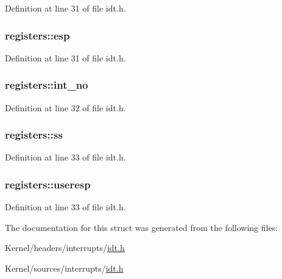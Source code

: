 Definition at line 31 of file idt.h.

\hypertarget{structregisters_aed2ad213a3e6d7cd3c5b922f1ad2d022}{
\subsubsection[{esp}]{ {\bf registers::esp}}}
\label{structregisters_aed2ad213a3e6d7cd3c5b922f1ad2d022}


Definition at line 31 of file idt.h.

\hypertarget{structregisters_afadd3a7e92865f4a39c222084541a641}{
\subsubsection[{int\_\-no}]{ {\bf registers::int\_\-no}}}
\label{structregisters_afadd3a7e92865f4a39c222084541a641}


Definition at line 32 of file idt.h.

\hypertarget{structregisters_a8e5909fb1d1fb5c5982513cffc2fd516}{
\subsubsection[{ss}]{ {\bf registers::ss}}}
\label{structregisters_a8e5909fb1d1fb5c5982513cffc2fd516}


Definition at line 33 of file idt.h.

\hypertarget{structregisters_ad7233aa5c26fc03fddda95d96f7bd259}{
\subsubsection[{useresp}]{ {\bf registers::useresp}}}
\label{structregisters_ad7233aa5c26fc03fddda95d96f7bd259}


Definition at line 33 of file idt.h.



The documentation for this struct was generated from the following files:\begin{DoxyCompactItemize}
\item 
Kernel/headers/interrupts/\hyperlink{headers_2interrupts_2idt_8h}{idt.h}\item 
Kernel/sources/interrupts/\hyperlink{sources_2interrupts_2idt_8h}{idt.h}\end{DoxyCompactItemize}
